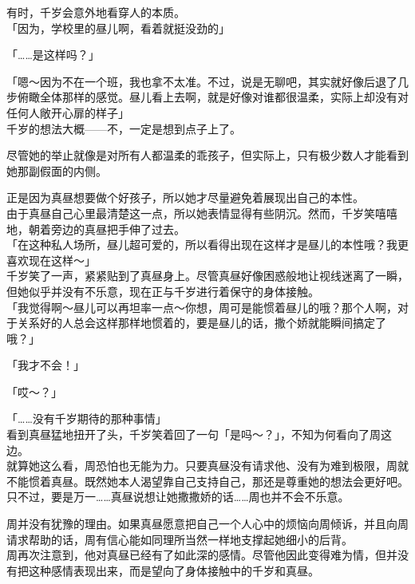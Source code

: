 有时，千岁会意外地看穿人的本质。\\

「因为，学校里的昼儿啊，看着就挺没劲的」

「……是这样吗？」

「嗯～因为不在一个班，我也拿不太准。不过，说是无聊吧，其实就好像后退了几步俯瞰全体那样的感觉。昼儿看上去啊，就是好像对谁都很温柔，实际上却没有对任何人敞开心扉的样子」\\

千岁的想法大概——不，一定是想到点子上了。

尽管她的举止就像是对所有人都温柔的乖孩子，但实际上，只有极少数人才能看到她那副假面的内侧。

正是因为真昼想要做个好孩子，所以她才尽量避免着展现出自己的本性。\\

由于真昼自己心里最清楚这一点，所以她表情显得有些阴沉。然而，千岁笑嘻嘻地，朝着旁边的真昼把手伸了过去。\\

「在这种私人场所，昼儿超可爱的，所以看得出现在这样才是昼儿的本性哦？我更喜欢现在这样～」\\

千岁笑了一声，紧紧贴到了真昼身上。尽管真昼好像困惑般地让视线迷离了一瞬，但她似乎并没有不乐意，现在正与千岁进行着保守的身体接触。\\

「我觉得啊～昼儿可以再坦率一点～你想，周可是能惯着昼儿的哦？那个人啊，对于关系好的人总会这样那样地惯着的，要是昼儿的话，撒个娇就能瞬间搞定了哦？」

「我才不会！」

「哎～？」

「……没有千岁期待的那种事情」\\

看到真昼猛地扭开了头，千岁笑着回了一句「是吗～？」，不知为何看向了周这边。\\

就算她这么看，周恐怕也无能为力。只要真昼没有请求他、没有为难到极限，周就不能惯着真昼。既然她本人渴望靠自己支持自己，那还是尊重她的想法会更好吧。\\

只不过，要是万一……真昼说想让她撒撒娇的话……周也并不会不乐意。

周并没有犹豫的理由。如果真昼愿意把自己一个人心中的烦恼向周倾诉，并且向周请求帮助的话，周有信心能如同理所当然一样地支撑起她细小的后背。\\

周再次注意到，他对真昼已经有了如此深的感情。尽管他因此变得难为情，但并没有把这种感情表现出来，而是望向了身体接触中的千岁和真昼。\\

